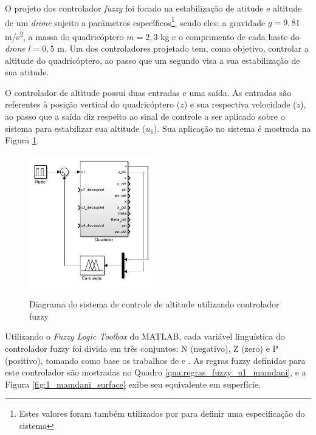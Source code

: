 O projeto dos controlador \textit{fuzzy} foi focado na estabilização de atitude e altitude de um \textit{drone} sujeito a parâmetros específicos\footnote{Estes valores foram também utilizados por  para definir uma especificação do sistema}, sendo eles: a gravidade $g=9,81$ m/s\textsuperscript{2}, a massa do quadricóptero $m=2,3$ kg e o comprimento de cada haste do \textit{drone} $l=0,5$ m. Um dos controladores projetado tem, como objetivo, controlar a altitude do quadricóptero, ao passo que um segundo visa a sua estabilização de sua atitude.

O controlador de altitude possui duas entradas e uma saída. As entradas são referentes à posição vertical do quadricóptero ($z$) e sua respectiva velocidade ($\dot{z}$), ao passo que a saída diz respeito ao sinal de controle a ser aplicado sobre o sistema para estabilizar sua altitude ($u_1$). Sua aplicação no sistema é mostrada na Figura \ref{fig:u1_mamdani_blocks}.

\begin{figure}[!htb]
    \centering
    \caption{Diagrama do sistema de controle de altitude utilizando controlador fuzzy}
    \includegraphics[width=0.5\textwidth]{./04-figuras/resultados/novos/simulink_printscreen_z}
    \label{fig:u1_mamdani_blocks}
\end{figure}

Utilizando o \textit{Fuzzy Logic Toolbox} do MATLAB, cada variável linguística do controlador fuzzy foi divida em três conjuntos: N (negativo), Z (zero) e P (positivo), tomando como base os trabalhos de  e . As regras fuzzy definidas para este controlador são mostradas no Quadro \ref{qua:regras_fuzzy_u1_mamdani}, e a Figura \ref{fig:1_mamdani_surface} exibe seu equivalente em superfície.

